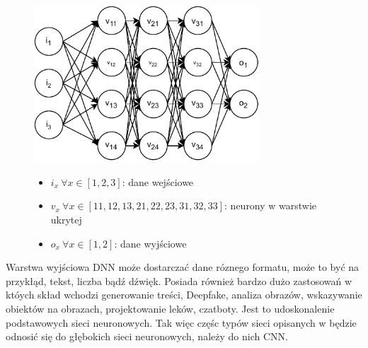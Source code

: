 \begin{figure}[H]
    \centering
    \includegraphics[width=0.75\textwidth]{images/deep-neural-network}
    \begin{itemize}
        \item[] $i_x \  \forall x \in [1, 2, 3]$: dane wejściowe
        \item[] $v_x \ \forall x \in [11, 12, 13, 21, 22, 23, 31, 32, 33]$: neurony w warstwie ukrytej
        \item[] $o_x \ \forall x \in [1, 2]$: dane wyjściowe
    \end{itemize}
    \label{fig:deep-learn}
\end{figure}

Warstwa wyjściowa DNN może dostarczać dane róznego formatu, może to być na przykłąd, tekst, liczba bądź dźwięk. Posiada również bardzo dużo zastosowań w któych skład wchodzi generowanie treści, Deepfake, analiza obrazów, wskazywanie obiektów na obrazach, projektowanie leków, czatboty. Jest to udoskonalenie podstawowych sieci neuronowych. Tak więc częśc typów sieci opisanych w  będzie odnosić się do głębokich sieci neuronowych, należy do nich CNN\cite{MicrosoftDepp2023}.